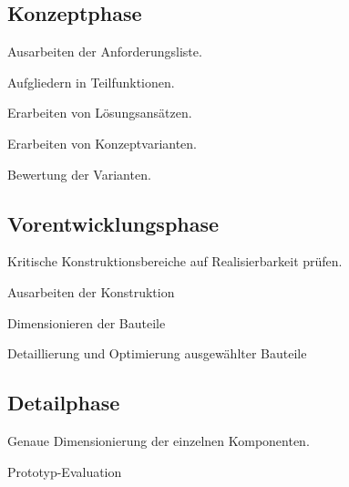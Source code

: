 	\subsection{Konzeptphase} %
		\begin{tightitemize}
			\item Ausarbeiten der Anforderungsliste.
			\item Aufgliedern in Teilfunktionen.
			\item Erarbeiten von Lösungsansätzen.
			\item Erarbeiten von Konzeptvarianten.
			\item Bewertung der Varianten.
		\end{tightitemize}
	\subsection{Vorentwicklungsphase} %
		Kritische Konstruktionsbereiche auf Realisierbarkeit prüfen.
		\begin{tightitemize}
			\item Ausarbeiten der Konstruktion
			\item Dimensionieren der Bauteile
			\item Detaillierung und Optimierung ausgewählter Bauteile
		\end{tightitemize}
	\subsection{Detailphase} %
		\begin{tightitemize}
			\item Genaue Dimensionierung der einzelnen Komponenten.
			\item Prototyp-Evaluation
		\end{tightitemize}
